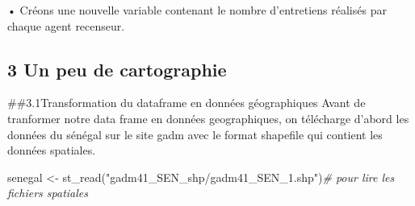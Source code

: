 \documentclass[
]{article}
\newenvironment{Shaded}{\begin{snugshade}}{\end{snugshade}}
\newcommand{\AttributeTok}[1]{\textcolor[rgb]{0.77,0.63,0.00}{#1}}
\newcommand{\CommentTok}[1]{\textcolor[rgb]{0.56,0.35,0.01}{\textit{#1}}}
\newcommand{\ConstantTok}[1]{\textcolor[rgb]{0.00,0.00,0.00}{#1}}
\newcommand{\DecValTok}[1]{\textcolor[rgb]{0.00,0.00,0.81}{#1}}
\newcommand{\FunctionTok}[1]{\textcolor[rgb]{0.00,0.00,0.00}{#1}}
\newcommand{\NormalTok}[1]{#1}
\newcommand{\OtherTok}[1]{\textcolor[rgb]{0.56,0.35,0.01}{#1}}
\newcommand{\SpecialCharTok}[1]{\textcolor[rgb]{0.00,0.00,0.00}{#1}}
\newcommand{\StringTok}[1]{\textcolor[rgb]{0.31,0.60,0.02}{#1}}
\begin{document}
\begin{Shaded}
\end{Shaded}

• Créons une nouvelle variable contenant le nombre d'entretiens réalisés
par chaque agent recenseur.

\hypertarget{un-peu-de-cartographie}{%
\subsection{3 Un peu de cartographie}\label{un-peu-de-cartographie}}

\#\#3.1Transformation du dataframe en données géographiques Avant de
tranformer notre data frame en données geographiques, on télécharge
d'abord les données du sénégal sur le site gadm avec le format shapefile
qui contient les données spatiales.

\begin{Shaded}
\begin{Highlighting}[]
\NormalTok{senegal }\OtherTok{\textless{}{-}} \FunctionTok{st\_read}\NormalTok{(}\StringTok{"gadm41\_SEN\_shp/gadm41\_SEN\_1.shp"}\NormalTok{)}\CommentTok{\# pour lire les fichiers spatiales}
\end{Highlighting}
\end{Shaded}
\end{document}
